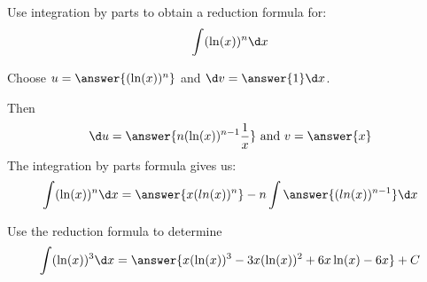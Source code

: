 \documentclass{ximera}
\author{Jason Miller}
\begin{document}
\begin{exercise}

Use integration by parts to obtain a reduction formula for:
\[
\int (\ln(x))^{n} \d x
\]


Choose $u=\answer{( \ln(x) )^{n} }$ and $\d v=\answer{1} \d x$.

Then
\[ \d u=\answer{n ( \ln(x) )^{n-1}\frac{1}{x}} \text{  and  } v=\answer{x}
\]
The integration by parts formula gives us:
\[
\int ( \ln(x) )^{n} \d x=\answer{x (ln(x))^{n}} - n \int \answer{(ln(x))^{n-1}} \d x
\]

Use the reduction formula to determine 
\[
\int ( \ln(x))^{3} \d x=\answer{x(\ln(x))^{3} -3x (\ln(x))^{2} + 6x \ln(x) -6x } + C
\]


\end{exercise}
\end{document}
